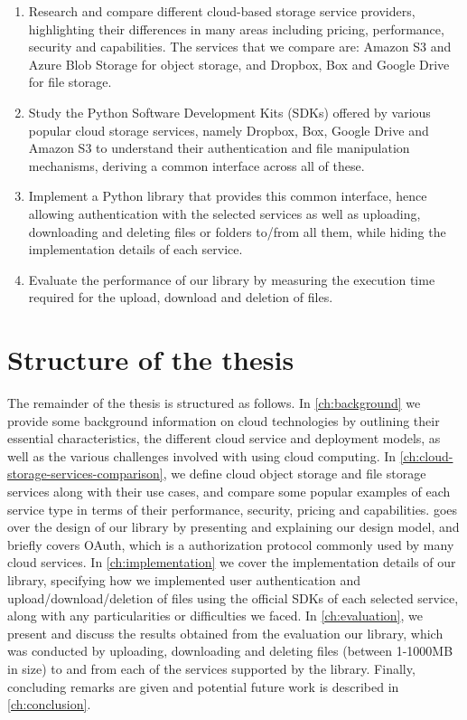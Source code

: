 \begin{enumerate}
    \item Research and compare different cloud-based storage service providers, highlighting their differences in many areas including pricing, performance, security and capabilities. The services that we compare are: Amazon S3 and Azure Blob Storage for object storage, and Dropbox, Box and Google Drive for file storage.

    \item Study the Python Software Development Kits (SDKs) offered by various popular cloud storage services, namely Dropbox, Box, Google Drive and Amazon S3 to understand their authentication and file manipulation mechanisms, deriving a common interface across all of these.

    \item Implement a Python library that provides this common interface, hence allowing authentication with the selected services as well as uploading, downloading and deleting files or folders to/from all them, while hiding the implementation details of each service.

    \item Evaluate the performance of our library by measuring the execution time required for the upload, download and deletion of files.
\end{enumerate}

\section{Structure of the thesis}
The remainder of the thesis is structured as follows. In \autoref{ch:background} we provide some background information on cloud technologies by outlining their essential characteristics, the different cloud service and deployment models, as well as the various challenges involved with using cloud computing. In \autoref{ch:cloud-storage-services-comparison}, we define cloud object storage and file storage services along with their use cases, and compare some popular examples of each service type in terms of their performance, security, pricing and capabilities.  goes over the design of our library by presenting and explaining our design model, and briefly covers OAuth, which is a authorization protocol commonly used by many cloud services. In \autoref{ch:implementation} we cover the implementation details of our library, specifying how we implemented user authentication and upload/download/deletion of files using the official SDKs of each selected service, along with any particularities or difficulties we faced. In \autoref{ch:evaluation}, we present and discuss the results obtained from the evaluation our library, which was conducted by uploading, downloading and deleting files (between 1-1000MB in size) to and from each of the services supported by the library. Finally, concluding remarks are given and potential future work is described in \autoref{ch:conclusion}.
